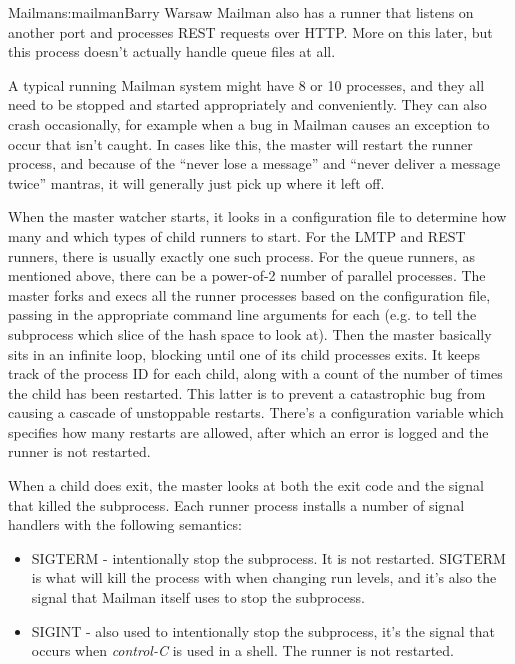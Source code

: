 \begin{aosachapter}{Mailman}{s:mailman}{Barry Warsaw}
Mailman also has a runner that listens on another port and processes REST
requests over HTTP.  More on this later, but this process doesn't actually
handle queue files at all.

A typical running Mailman system might have 8 or 10 processes, and they all
need to be stopped and started appropriately and conveniently.  They can also
crash occasionally, for example when a bug in Mailman causes an exception to
occur that isn't caught.  In cases like this, the master will restart the
runner process, and because of the ``never lose a message'' and ``never deliver a
message twice'' mantras, it will generally just pick up where it left off.

When the master watcher starts, it looks in a configuration file to determine
how many and which types of child runners to start.  For the LMTP and REST
runners, there is usually exactly one such process.  For the queue runners, as
mentioned above, there can be a power-of-2 number of parallel processes.  The
master forks and execs all the runner processes based on the configuration
file, passing in the appropriate command line arguments for each (e.g. to tell
the subprocess which slice of the hash space to look at).  Then the master
basically sits in an infinite loop, blocking until one of its child processes
exits.  It keeps track of the process ID for each child, along with a count of
the number of times the child has been restarted.  This latter is to prevent a
catastrophic bug from causing a cascade of unstoppable restarts.  There's a
configuration variable which specifies how many restarts are allowed, after
which an error is logged and the runner is not restarted.

When a child does exit, the master looks at both the exit code and the signal
that killed the subprocess.  Each runner process installs a number of signal
handlers with the following semantics:

\begin{itemize}

\item SIGTERM - intentionally stop the subprocess.  It is not restarted.  SIGTERM
is what  will kill the process with when changing run levels, and
it's also the signal that Mailman itself uses to stop the subprocess.

\item SIGINT - also used to intentionally stop the subprocess, it's the signal
that occurs when \emph{control-C} is used in a shell.  The runner is not
restarted.


\end{itemize}
\end{aosachapter}
